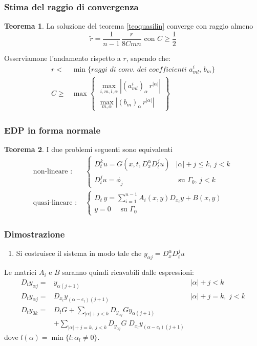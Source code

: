 \documentclass[serif,notheorems]{beamer}
\theoremstyle{definition} %
\newtheorem{theorem}{Teorema}[section] %
\theoremstyle{remark}
\begin{document}
\begin{frame}
\frametitle{Stima del raggio di convergenza}
\begin{theorem}
La soluzione del teorema \ref{teoquasilin} converge con raggio almeno
$$\widetilde{r} = \dfrac{1}{n-1}\, \dfrac{r}{8Cmn} \text{ con } C \geq \frac{1}{2}$$
\end{theorem}

Osserviamone l'andamento rispetto a $r$, sapendo che:
\begin{align*}
r <& \min \{ \textit{raggi di conv. dei coefficienti } a^i_{ml}, \, b_m\} \\
C \geq & \max \begin{Bmatrix}
\max\limits_{i,m,l,\alpha } \left| (a^i_{ml})_\alpha \, r^{|\alpha |}\right|\\
\max\limits_{m,\alpha} \left|(b_m)_\alpha \, r^{|\alpha |}\right|
\end{Bmatrix}
\end{align*}
\end{frame}

\begin{frame}
\frametitle{EDP in forma normale}
\begin{theorem}
I due problemi seguenti sono equivalenti
\begin{align*}
\text{non-lineare : }&
\begin{cases}
D_{t}^k u = G(x,t, D^\alpha_x D^j_t u) & |\alpha |+ j \leq k, \, j<k \\
D_t^ju = \phi_j & \text{ su } \Gamma_0, \, j<k
\end{cases} \\
\text{quasi-lineare : }&
\begin{cases}
D_t \, y = \sum\limits_{i=1}^{n-1} A_i(x,y)D_{x_i}y+B(x,y) \; \\
y=0 \quad \text{ su } \Gamma_0
\end{cases}
\end{align*}
\end{theorem}
\end{frame}

\begin{frame}
\frametitle{Dimostrazione}
\begin{enumerate}
\item Si costruisce il sistema in modo tale che $y_{\alpha j}= D^\alpha_x D^j_t u$ 
\end{enumerate}
Le matrici $A_i$ e $B$ saranno quindi ricavabili dalle espressioni:
\begin{align*}
D_t y_{\alpha j} =& y_{\alpha (j+1)} & |\alpha| + j < k \\
D_t y_{\alpha j} =& D_{x_l} y_{(\alpha-e_l)(j+1)} & |\alpha| + j = k, \; j < k\\
D_t y_{0k} =& D_tG + \sum_{|\alpha|+j < k} D_{y_{\alpha j}}G y_{\alpha (j+1)} \\
& + \sum_{|\alpha|+j = k, \; j < k} D_{y_{\alpha j}} G \; D_{x_l} y_{(\alpha-e_l)(j+1)}
\end{align*}
dove $l(\alpha)=\min\{ l:\alpha_l \neq 0 \}$.
\end{frame}
\end{document}
